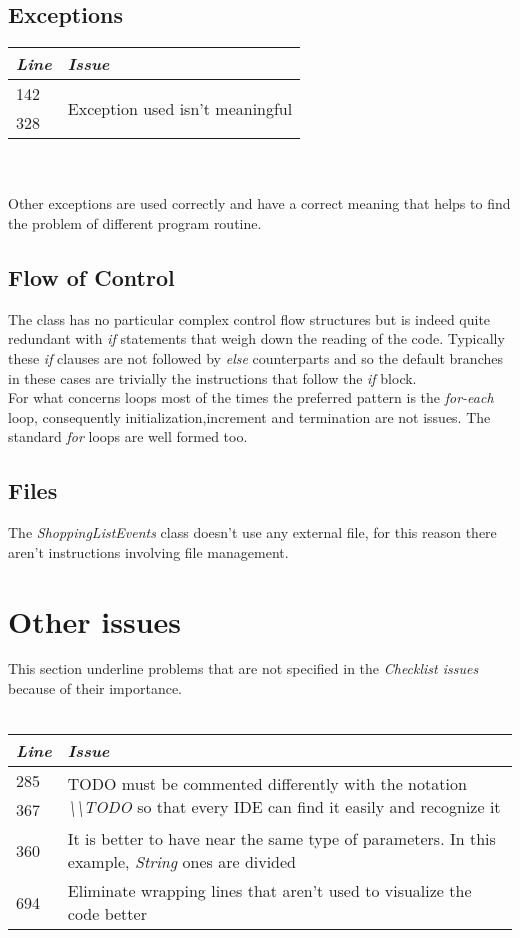 \documentclass[11pt,a4paper]{report}
\begin{document}
\subsection{Exceptions}
\begin{tabularx}{\textwidth}{|l|X|}
	\hline
	\textit{Line} & \textit{Issue}\\
	\hline
	\hline
	142 & \multirow{2}{*}{Exception used isn't meaningful}\\
	328 & \\
	\hline
\end{tabularx}\\
\\
Other exceptions are used correctly and have a correct meaning that helps to find the problem of different program routine.
\subsection{Flow of Control}
The class has no particular complex control flow structures but is indeed quite redundant with \textit{if} statements that weigh down the reading of the code. Typically these \textit{if} clauses are not followed by \textit{else} counterparts and so the default branches in these cases are trivially the instructions that follow the \textit{if} block.\\For what concerns loops most of the times the preferred pattern is the \textit{for-each} loop, consequently initialization,increment and termination are not issues. The standard \textit{for} loops are well formed too.
\subsection{Files}
The \textit{ShoppingListEvents} class doesn't use any external file, for this reason there aren't instructions involving file management.
\section{Other issues}
This section underline problems that are not specified in the \textit{Checklist issues} because of their importance.\\\\
\begin{tabularx}{\textwidth}{|l|X|}
	\hline
	\textit{Line} & \textit{Issue}\\
	\hline
	\hline
	285 & \multirow{2}{\linewidth}{TODO must be commented differently with the notation \textit{\textbackslash\textbackslash TODO} so that every IDE can find it easily and recognize it}\\
	367 & \\
	\hline
	360 & It is better to have near the same type of parameters. In this example, \textit{String} ones are divided\\
	\hline
	694 & Eliminate wrapping lines that aren't used to visualize the code better\\
	\hline
\end{tabularx}
\end{document}
